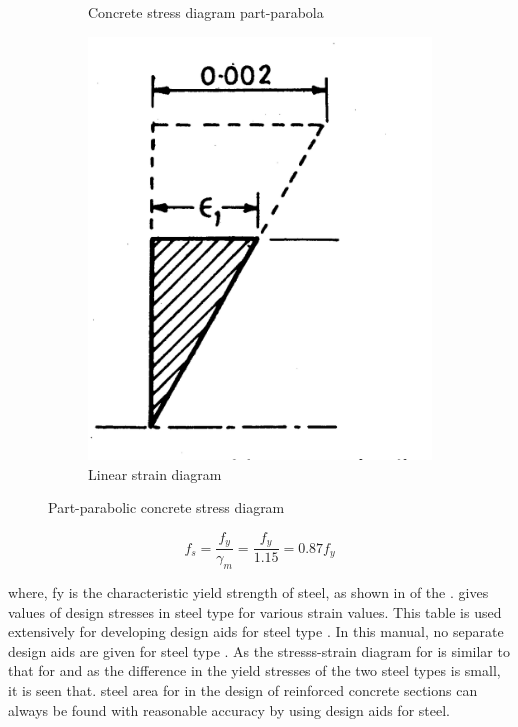\begin{figure}
\begin{subfigure}{0.3\textwidth}
\caption{Concrete stress diagram part-parabola}
\label{fig:stress}
\end{subfigure}
%
\begin{subfigure}{0.3\textwidth}
\centering
\includegraphics[width=\textwidth]{images/linearstrainc.png}
\caption{Linear strain diagram}
\label{fig:strain}
\end{subfigure}
\caption{Part-parabolic concrete stress diagram}
\label{fig:part}
\end{figure}

\begin{equation}
f_s=\frac{f_y}{\gamma_m}=\frac{f_y}{1.15}=0.87f_y
\end{equation}

where, fy is the characteristic yield strength of steel, as shown in
 of the .  gives values of design
stresses in steel type {\fefouronefive} for various strain values.
This table is used extensively for developing design aids for steel
type {\fefouronefive}. In this manual, no separate design aids are given
for steel type {\fefivezerozero}. As the stresss-strain diagram for
{\fefivezerozero} is similar to that for {\fefouronefive} and as the difference in
the yield stresses of the two steel types is small, it is seen that. 
steel area for {\fefivezerozero}  in the design of reinforced concrete 
sections can always be found with reasonable accuracy by using design
aids for steel.

